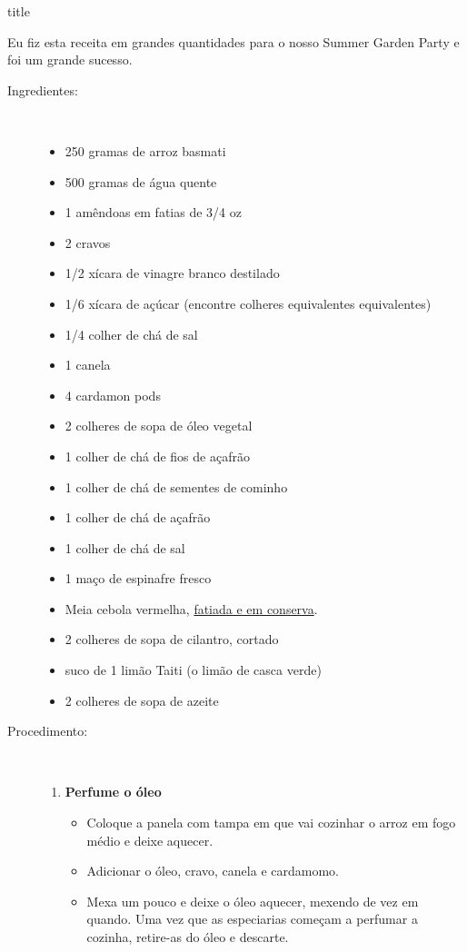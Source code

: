 \documentclass [11pt, letterpaper] {article}
\begin{document}
 {title}

Eu fiz esta receita em grandes quantidades para o nosso Summer Garden Party e foi um grande sucesso.


\begin {description}

\item [Ingredientes:] \ \\
\begin {itemize}
\item 250 gramas de arroz basmati
\item 500 gramas de água quente
\item 1 amêndoas em fatias de 3/4 oz
\item 2 cravos
\item 1/2 xícara de vinagre branco destilado
\item 1/6 xícara de açúcar (encontre colheres equivalentes equivalentes)
\item 1/4 colher de chá de sal
\item 1 canela
\item 4 cardamon pods
\item 2 colheres de sopa de óleo vegetal
\item 1 colher de chá de fios de açafrão
\item 1 colher de chá de sementes de cominho
\item 1 colher de chá de açafrão
\item 1 colher de chá de sal
\item 1 ma\c{c}o de espinafre fresco
\item Meia cebola vermelha, \href{PickledRedOnions.html}{fatiada e em conserva}. 
\item 2 colheres de sopa de cilantro, cortado
\item suco de 1 lim\~ao Taiti (o lim\~ao de casca verde)
\item 2 colheres de sopa de azeite
\end {itemize}


\item [Procedimento:] \ \\

\begin {enumerate}
\item {\bf Perfume o óleo}
\begin {itemize}
\item Coloque a panela com tampa em que vai cozinhar o arroz em fogo médio e deixe aquecer.
\item Adicionar o óleo, cravo, canela e cardamomo.
\item Mexa um pouco e deixe o óleo aquecer, mexendo de vez em quando. Uma vez que as especiarias começam a perfumar a cozinha, retire-as do óleo e descarte.
\end {itemize}


\end{enumerate}
\end{description}
\end{document}
